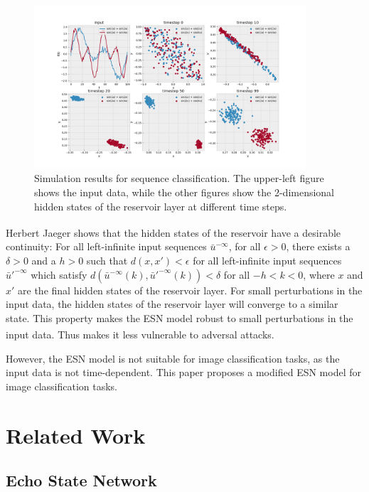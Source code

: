 \documentclass{article}
\newcommand{\upcite}[1]{\textsuperscript{\cite{#1}}} %
\begin{document}
\begin{figure}[htbp]
    \centering
    \includegraphics[width=0.9\textwidth]{assets/sequence_distance.png}
    \caption{Simulation results for sequence classification. 
    The upper-left figure shows the input data, while the other
    figures show the 2-dimensional hidden states of the reservoir layer at 
    different time steps.}
    \label{fig:sequence_distance}
\end{figure}


Herbert Jaeger\upcite{ESN} shows that the hidden states of the reservoir have a desirable continuity: 
For all left-infinite input sequences $\bar u^{-\infty}$, for all $\epsilon > 0$, there exists a $\delta > 0$ 
and a $h > 0$ such that $d(x, x') < \epsilon$ for all left-infinite input sequences $\bar u'^{-\infty}$ which 
satisfy $d(\bar u^{-\infty}(k), \bar u'^{-\infty}(k)) < \delta$ for all $-h < k < 0$, where $x$ and $x'$ are 
the final hidden states of the reservoir layer. For small perturbations in the input data, 
the hidden states of the reservoir layer will converge to a similar state.
This property makes the ESN model robust to small perturbations 
in the input data. Thus makes it less vulnerable to adversal attacks\upcite{Adversarial}.

However, the ESN model is not suitable for image classification tasks, as the input data is not time-dependent.
This paper proposes a modified ESN model for image classification tasks.


\section{Related Work}

\subsection{Echo State Network}
\end{document}
